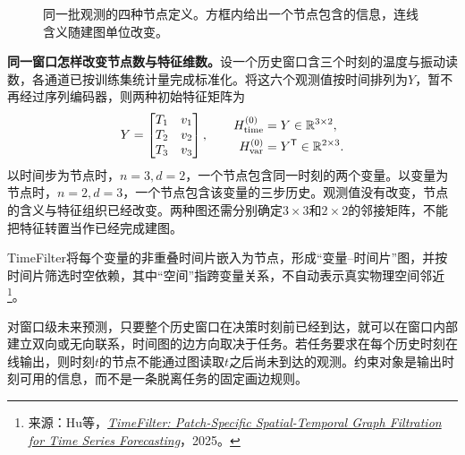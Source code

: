 \begin{figure}[htbp]
\caption{同一批观测的四种节点定义。方框内给出一个节点包含的信息，连线含义随建图单位改变。}
\label{fig:graph-node-units}
\end{figure}

\textbf{同一窗口怎样改变节点数与特征维数。}设一个历史窗口含三个时刻的温度与振动读数，各通道已按训练集统计量完成标准化。将这六个观测值按时间排列为$Y$，暂不再经过序列编码器，则两种初始特征矩阵为
\[
 Y=\begin{bmatrix}T_1&v_1\\T_2&v_2\\T_3&v_3\end{bmatrix},\qquad
 \begin{aligned}
  H_{\mathrm{time}}^{(0)}&=Y\in\mathbb{R}^{3\times2},\\
  H_{\mathrm{var}}^{(0)}&=Y^{\mathsf T}\in\mathbb{R}^{2\times3}.
 \end{aligned}
\]
以时间步为节点时，$n=3,d=2$，一个节点包含同一时刻的两个变量。以变量为节点时，$n=2,d=3$，一个节点包含该变量的三步历史。观测值没有改变，节点的含义与特征组织已经改变。两种图还需分别确定$3\times3$和$2\times2$的邻接矩阵，不能把特征转置当作已经完成建图。

TimeFilter将每个变量的非重叠时间片嵌入为节点，形成“变量--时间片”图，并按时间片筛选时空依赖，其中“空间”指跨变量关系，不自动表示真实物理空间邻近\footnote{来源：Hu等，\href{https://proceedings.mlr.press/v267/hu25ac.html}{\textit{TimeFilter: Patch-Specific Spatial-Temporal Graph Filtration for Time Series Forecasting}}，2025。}。

对窗口级未来预测，只要整个历史窗口在决策时刻前已经到达，就可以在窗口内部建立双向或无向联系，时间图的边方向取决于任务。若任务要求在每个历史时刻在线输出，则时刻$t$的节点不能通过图读取$t$之后尚未到达的观测。约束对象是输出时刻可用的信息，而不是一条脱离任务的固定画边规则。

